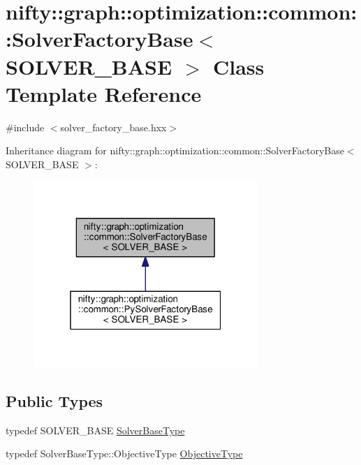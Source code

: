 \hypertarget{classnifty_1_1graph_1_1optimization_1_1common_1_1SolverFactoryBase}{}\section{nifty\+:\+:graph\+:\+:optimization\+:\+:common\+:\+:Solver\+Factory\+Base$<$ S\+O\+L\+V\+E\+R\+\_\+\+B\+A\+S\+E $>$ Class Template Reference}
\label{classnifty_1_1graph_1_1optimization_1_1common_1_1SolverFactoryBase}


{\ttfamily \#include $<$solver\+\_\+factory\+\_\+base.\+hxx$>$}



Inheritance diagram for nifty\+:\+:graph\+:\+:optimization\+:\+:common\+:\+:Solver\+Factory\+Base$<$ S\+O\+L\+V\+E\+R\+\_\+\+B\+A\+S\+E $>$\+:\nopagebreak
\begin{figure}[H]
\begin{center}
\leavevmode
\includegraphics[width=241pt]{classnifty_1_1graph_1_1optimization_1_1common_1_1SolverFactoryBase__inherit__graph}
\end{center}
\end{figure}
\subsection*{Public Types}
\begin{DoxyCompactItemize}
\item 
typedef S\+O\+L\+V\+E\+R\+\_\+\+B\+A\+S\+E \hyperlink{classnifty_1_1graph_1_1optimization_1_1common_1_1SolverFactoryBase_a32303ac07d31050bd56939ba09332a8c}{Solver\+Base\+Type}
\item 
typedef Solver\+Base\+Type\+::\+Objective\+Type \hyperlink{classnifty_1_1graph_1_1optimization_1_1common_1_1SolverFactoryBase_addf5fe831de3b6d9e3473eee67490a5c}{Objective\+Type}
\end{DoxyCompactItemize}
